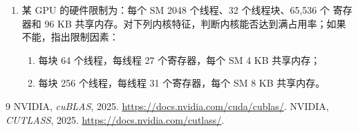 \begin{enumerate}[label=\arabic*.,leftmargin=2.7em]
  \noindent\textbf{译者注：}底本的主机函数参数类型写成 ，而内核
  形参为 ；本译稿保留题目代码并提醒读者，实际编译时应统一类型。

  \item 某 GPU 的硬件限制为：每个 SM 2048 个线程、32 个线程块、65,536 个
  寄存器和 96 KB 共享内存。对下列内核特征，判断内核能否达到满占用率；如果
  不能，指出限制因素：
  \begin{enumerate}[label=\alph*.,leftmargin=2.2em]
    \item 每块 64 个线程，每线程 27 个寄存器，每个 SM 4 KB 共享内存；
    \item 每块 256 个线程，每线程 31 个寄存器，每个 SM 8 KB 共享内存。
  \end{enumerate}
\end{enumerate}

\begin{chapterbibliography}{9}
  NVIDIA, \emph{cuBLAS}, 2025.
  \url{https://docs.nvidia.com/cuda/cublas/}.
  NVIDIA, \emph{CUTLASS}, 2025.
  \url{https://docs.nvidia.com/cutlass/}.
\end{chapterbibliography}

